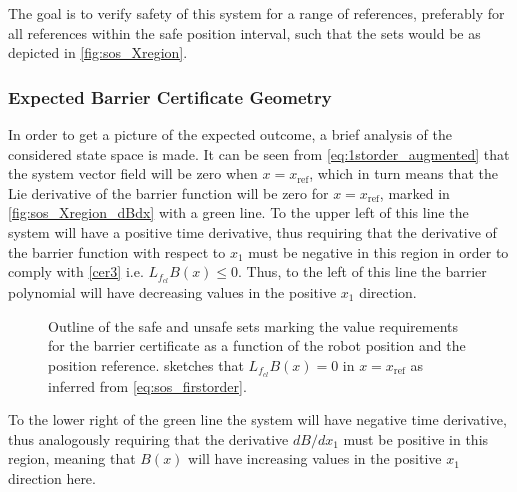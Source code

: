 The goal is to verify safety of this system for a range of references, preferably for all references within the safe position interval, such that the sets would be as depicted in \autoref{fig:sos_Xregion}.

\subsubsection{Expected Barrier Certificate Geometry}

\vspace{-2mm}
In order to get a picture of the expected outcome, a brief analysis of the considered state space is made.
It can be seen from \autoref{eq:1storder_augmented} that the system vector field will be zero when $x=x_\text{ref}$, which in turn means that the Lie derivative of the barrier function will be zero for $x=x_\text{ref}$, marked in \autoref{fig:sos_Xregion_dBdx} with a green line. 
To the upper left of this line the system will have a positive time derivative, thus requiring that the derivative of the barrier function with respect to $x_1$ must be negative in this region in order to comply with \autoref{cer3} i.e. $L_{f_{cl}}B(x) \leq 0$. 
Thus, to the left of this line the barrier polynomial will have decreasing values in the positive $x_1$ direction. 
\begin{figure}[htbp]
	\centering
	\hspace{3mm}
	\hspace{3mm}
	\caption{Outline of the safe and unsafe sets marking the value requirements for the barrier certificate as a function of the robot position and the  position reference. %
		 sketches that $L_{f_{cl}}B(x)=0$  in $x=x_\text{ref}$ as inferred from \autoref{eq:sos_firstorder}. %
	}
	\label{fig:sets_reference}
\end{figure}
To the lower right of the green line the system will have negative time derivative, thus analogously requiring that the derivative $dB/dx_1$ must be positive in this region, meaning that $B(x)$ will have increasing values in the positive $x_1$ direction here.

